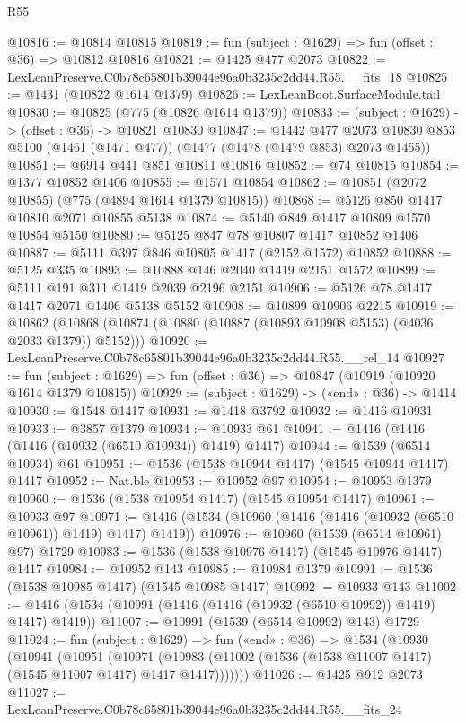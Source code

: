 \begin{lexlean}{R55}
\begin{coremodule}
{{@10816 := @10814 @10815
@10819 := fun (subject : @1629) => fun (offset : @36) => @10812 @10816
@10821 := @1425 @477 @2073
@10822 := LexLeanPreserve.C0b78c65801b39044e96a0b3235c2dd44.R55.__fits_18
@10825 := @1431 (@10822 @1614 @1379)
@10826 := LexLeanBoot.SurfaceModule.tail
@10830 := @10825 (@775 (@10826 @1614 @1379))
@10833 := (subject : @1629) -> (offset : @36) -> @10821 @10830
@10847 := @1442
    @477
    @2073
    @10830
    @853
    @5100
    (@1461 (@1471 @477))
    (@1477 (@1478 (@1479 @853) @2073 @1455))
@10851 := @6914 @441 @851 @10811 @10816
@10852 := @74 @10815
@10854 := @1377 @10852 @1406
@10855 := @1571 @10854
@10862 := @10851 (@2072 @10855) (@775 (@4894 @1614 @1379 @10815))
@10868 := @5126 @850 @1417 @10810 @2071 @10855 @5138
@10874 := @5140 @849 @1417 @10809 @1570 @10854 @5150
@10880 := @5125 @847 @78 @10807 @1417 @10852 @1406
@10887 := @5111 @397 @846 @10805 @1417 (@2152 @1572) @10852
@10888 := @5125 @335
@10893 := @10888 @146 @2040 @1419 @2151 @1572
@10899 := @5111 @191 @311 @1419 @2039 @2196 @2151
@10906 := @5126 @78 @1417 @1417 @2071 @1406 @5138 @5152
@10908 := @10899 @10906 @2215
@10919 := @10862 (@10868 (@10874 (@10880 (@10887 (@10893 @10908 @5153) (@4036 @2033 @1379)) @5152)))
@10920 := LexLeanPreserve.C0b78c65801b39044e96a0b3235c2dd44.R55.__rel_14
@10927 := fun (subject : @1629) => fun (offset : @36) => @10847 (@10919 (@10920 @1614 @1379 @10815))
@10929 := (subject : @1629) -> («end» : @36) -> @1414
@10930 := @1548 @1417
@10931 := @1418 @3792
@10932 := @1416 @10931
@10933 := @3857 @1379
@10934 := @10933 @61
@10941 := @1416 (@1416 (@1416 (@10932 (@6510 @10934)) @1419) @1417)
@10944 := @1539 (@6514 @10934) @61
@10951 := @1536 (@1538 @10944 @1417) (@1545 @10944 @1417) @1417
@10952 := Nat.ble
@10953 := @10952 @97
@10954 := @10953 @1379
@10960 := @1536 (@1538 @10954 @1417) (@1545 @10954 @1417)
@10961 := @10933 @97
@10971 := @1416 (@1534 (@10960 (@1416 (@1416 (@10932 (@6510 @10961)) @1419) @1417) @1419))
@10976 := @10960 (@1539 (@6514 @10961) @97) @1729
@10983 := @1536 (@1538 @10976 @1417) (@1545 @10976 @1417) @1417
@10984 := @10952 @143
@10985 := @10984 @1379
@10991 := @1536 (@1538 @10985 @1417) (@1545 @10985 @1417)
@10992 := @10933 @143
@11002 := @1416 (@1534 (@10991 (@1416 (@1416 (@10932 (@6510 @10992)) @1419) @1417) @1419))
@11007 := @10991 (@1539 (@6514 @10992) @143) @1729
@11024 := fun (subject : @1629) =>
  fun («end» : @36) =>
  @1534
    (@10930
      (@10941
        (@10951
          (@10971
            (@10983 (@11002 (@1536 (@1538 @11007 @1417) (@1545 @11007 @1417) @1417 @1417)))))))
@11026 := @1425 @912 @2073
@11027 := LexLeanPreserve.C0b78c65801b39044e96a0b3235c2dd44.R55.__fits_24
}}
\end{coremodule}
\end{lexlean}
